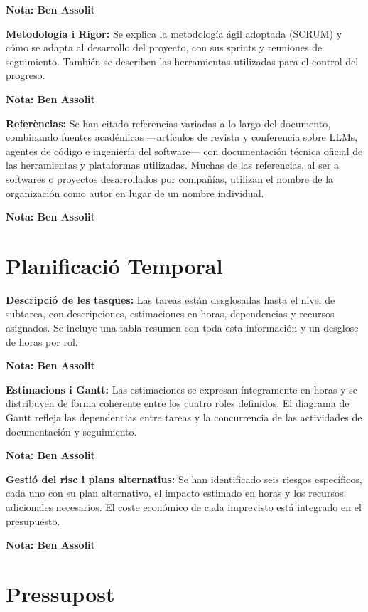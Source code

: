 \documentclass[12pt, a4paper]{article}
\begin{document}
\textbf{Nota: Ben Assolit}

\textbf{Metodologia i Rigor:} Se explica la metodología ágil adoptada (SCRUM) y cómo se adapta al desarrollo del proyecto, con sus sprints y reuniones de seguimiento. También se describen las herramientas utilizadas para el control del progreso.

\textbf{Nota: Ben Assolit}

\textbf{Referèncias:} Se han citado referencias variadas a lo largo del documento, combinando fuentes académicas —artículos de revista y conferencia sobre LLMs, agentes de código e ingeniería del software— con documentación técnica oficial de las herramientas y plataformas utilizadas. Muchas de las referencias, al ser a softwares o proyectos desarrollados por compañías, utilizan el nombre de la organización como autor en lugar de un nombre individual.

\textbf{Nota: Ben Assolit}

\section{Planificació Temporal}

\textbf{Descripció de les tasques:} Las tareas están desglosadas hasta el nivel de subtarea, con descripciones, estimaciones en horas, dependencias y recursos asignados. Se incluye una tabla resumen con toda esta información y un desglose de horas por rol.

\textbf{Nota: Ben Assolit}

\textbf{Estimacions i Gantt:} Las estimaciones se expresan íntegramente en horas y se distribuyen de forma coherente entre los cuatro roles definidos. El diagrama de Gantt refleja las dependencias entre tareas y la concurrencia de las actividades de documentación y seguimiento.

\textbf{Nota: Ben Assolit}

\textbf{Gestió del risc i plans alternatius:} Se han identificado seis riesgos específicos, cada uno con su plan alternativo, el impacto estimado en horas y los recursos adicionales necesarios. El coste económico de cada imprevisto está integrado en el presupuesto.

\textbf{Nota: Ben Assolit}

\section{Pressupost}
\end{document}
